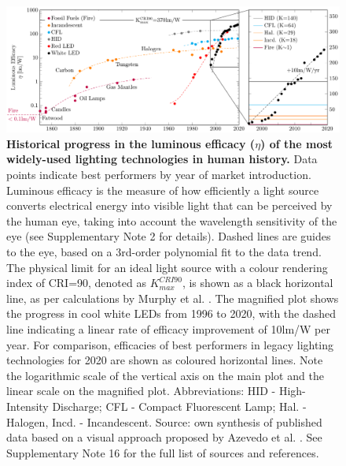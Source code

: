 \documentclass[parskip=full]{article}
\begin{document}
\begin{figure}[H]
 \centering
 \includegraphics[width=\textwidth]{figures/history_efficacy.pdf}
 \caption{\textbf{Historical progress in the luminous efficacy ($\eta$) of the most widely-used lighting technologies in human history.} Data points indicate best performers by year of market introduction. Luminous efficacy is the measure of how efficiently a light source converts electrical energy into visible light that can be perceived by the human eye, taking into account the wavelength sensitivity of the eye (see Supplementary Note 2 for details). Dashed lines are guides to the eye, based on a 3rd-order polynomial fit to the data trend. The physical limit for an ideal light source with a colour rendering index of CRI=90, denoted as $K_{max}^{CRI90}$, is shown as a black horizontal line, as per calculations by Murphy et al. \cite{Murphy2012}. The magnified plot shows the progress in cool white LEDs from 1996 to 2020, with the dashed line indicating a linear rate of efficacy improvement of 10lm/W per year. For comparison, efficacies of best performers in legacy lighting technologies for 2020 are shown as coloured horizontal lines. Note the logarithmic scale of the vertical axis on the main plot and the linear scale on the magnified plot. Abbreviations: HID - High-Intensity Discharge; CFL - Compact Fluorescent Lamp; Hal. - Halogen, Incd. - Incandescent. Source: own synthesis of published data based on a visual approach proposed by Azevedo et al. \cite{azevedo2009transition}. See Supplementary Note 16 for the full list of sources and references.}
 \label{fgr:history_efficacy}
 \vspace{-7mm}
\end{figure}

\clearpage
\end{document}
